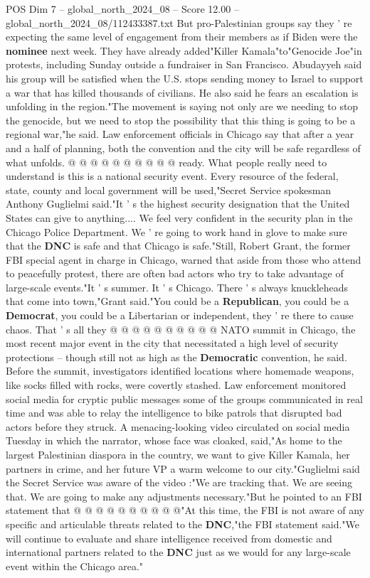 \begin{textsample}{POS Dim 7 – global\_north\_2024\_08 – Score 12.00 – global\_north\_2024\_08/112433387.txt}
But pro-Palestinian groups say they ' re expecting the same level of engagement from their members as if Biden were the \textbf{nominee} next week.
They have already added"Killer Kamala"to"Genocide Joe"in protests, including Sunday outside a fundraiser in San Francisco.
Abudayyeh said his group will be satisfied when the U.S. stops sending money to Israel to support a war that has killed thousands of civilians.
He also said he fears an escalation is unfolding in the region."The movement is saying not only are we needing to stop the genocide, but we need to stop the possibility that this thing is going to be a regional war,"he said.
Law enforcement officials in Chicago say that after a year and a half of planning, both the convention and the city will be safe regardless of what unfolds. @ @ @ @ @ @ @ @ @ @ ready.
What people really need to understand is this is a national security event.
Every resource of the federal, state, county and local government will be used,"Secret Service spokesman Anthony Guglielmi said."It ' s the highest security designation that the United States can give to anything....
We feel very confident in the security plan in the Chicago Police Department.
We ' re going to work hand in glove to make sure that the \textbf{DNC} is safe and that Chicago is safe."Still, Robert Grant, the former FBI special agent in charge in Chicago, warned that aside from those who attend to peacefully protest, there are often bad actors who try to take advantage of large-scale events."It ' s summer.
It ' s Chicago.
There ' s always knuckleheads that come into town,"Grant said."You could be a \textbf{Republican}, you could be a \textbf{Democrat}, you could be a Libertarian or independent, they ' re there to cause chaos.
That ' s all they @ @ @ @ @ @ @ @ @ @ NATO summit in Chicago, the most recent major event in the city that necessitated a high level of security protections -- though still not as high as the \textbf{Democratic} convention, he said.
Before the summit, investigators identified locations where homemade weapons, like socks filled with rocks, were covertly stashed.
Law enforcement monitored social media for cryptic public messages some of the groups communicated in real time and was able to relay the intelligence to bike patrols that disrupted bad actors before they struck.
A menacing-looking video circulated on social media Tuesday in which the narrator, whose face was cloaked, said,"As home to the largest Palestinian diaspora in the country, we want to give Killer Kamala, her partners in crime, and her future VP a warm welcome to our city."Guglielmi said the Secret Service was aware of the video :"We are tracking that.
We are seeing that.
We are going to make any adjustments necessary."But he pointed to an FBI statement that @ @ @ @ @ @ @ @ @ @"At this time, the FBI is not aware of any specific and articulable threats related to the \textbf{DNC},"the FBI statement said."We will continue to evaluate and share intelligence received from domestic and international partners related to the \textbf{DNC} just as we would for any large-scale event within the Chicago area."


\end{textsample}
